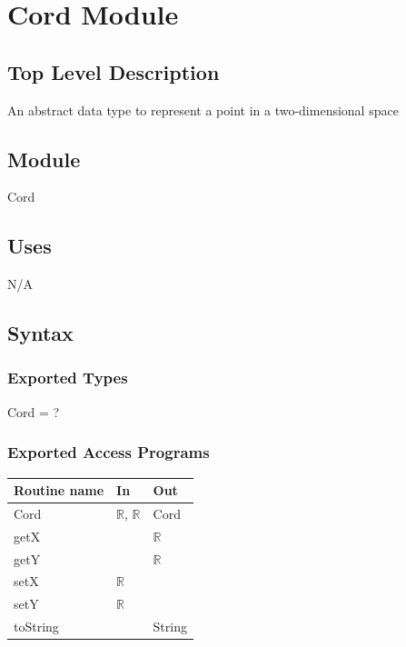 \documentclass[12pt]{article}
\begin{document}
\newpage

\section*{Cord Module}

\subsection*{Top Level Description}

An abstract data type to represent a point in a two-dimensional space

\subsection*{Module}

Cord

\subsection* {Uses}

N/A

\subsection* {Syntax}

\subsubsection* {Exported Types}

Cord = ?

\subsubsection* {Exported Access Programs}

\begin{tabular}{| l | l | l |}
\hline
\textbf{Routine name} & \textbf{In} & \textbf{Out}\\
\hline
Cord & $\mathbb{R}$, $\mathbb{R}$ & Cord\\
\hline
getX & ~ & $\mathbb{R}$\\
\hline
getY & ~ & $\mathbb{R}$\\
\hline
setX & $\mathbb{R}$ & ~\\
\hline
setY & $\mathbb{R}$ & ~\\
\hline
toString & ~ & String \\
\hline
\end{tabular}
\end{document}
